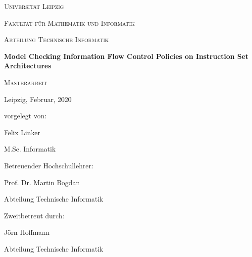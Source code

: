 \documentclass[headings=standardclasses]{scrbook}
\theoremstyle{remark}
\begin{document}
\begin{titlepage}
    \centering
    \par
    \vspace{1cm}
    {\scshape\LARGE Universität Leipzig} \par
    \vspace{0.3cm}
    {\scshape\Large Fakultät für Mathematik und Informatik} \par
    {\scshape\Large Abteilung Technische Informatik} \par
    \vspace{2.3cm}
    {\huge\bfseries Model Checking Information Flow Control Policies on Instruction Set Architectures} \par
    \vspace{1.5cm}
    {\scshape\Large Masterarbeit} \par
    \vspace{1.8cm}
    \begin{multicols}{2}
        Leipzig, Februar, 2020 \par
        \columnbreak
        vorgelegt von: \par
        Felix Linker \par
        M.Sc. Informatik
    \end{multicols}
    \vfill
    \begin{multicols}{2}
        Betreuender Hochschullehrer: \par
        Prof. Dr. Martin Bogdan \par
        Abteilung Technische Informatik \par
        \columnbreak
        Zweitbetreut durch: \par
        Jörn Hoffmann \par
        Abteilung Technische Informatik
    \end{multicols}
\end{titlepage}

\pagestyle{empty}
\renewcommand{\chapterpagestyle}{empty}



\tableofcontents

\printnoidxglossary[type=acronym]

\thispagestyle{empty}
\pagestyle{plain}
\renewcommand{\chapterpagestyle}{plain}
\setcounter{page}{-1}
\end{document}
